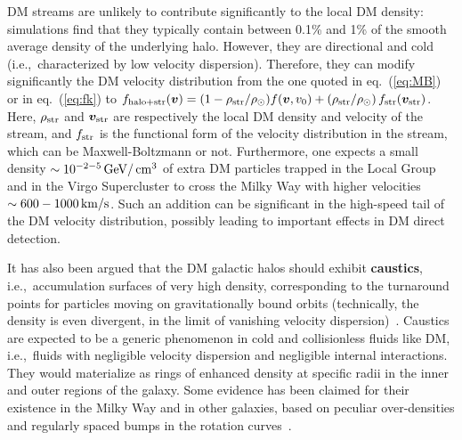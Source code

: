 DM streams are unlikely to contribute significantly to the local DM density: simulations find that they typically contain between 0.1\% and 1\% of the smooth average density of the underlying halo. However, they are directional and cold (i.e.,~characterized by low velocity dispersion). Therefore, they can modify significantly the DM velocity distribution from the one quoted in eq.~(\ref{eq:MB}) or in eq.~(\ref{eq:fk}) to $f_{\rm halo + str}(\vec v) =  (1-\rho_{\rm str} / \rho_\odot) f(\vec v,v_0) + \left( \rho_{\rm str}/\rho_\odot \right) f_{\rm str}(\vec v_{\rm str})$. Here, $\rho_{\rm str}$ and $\vec v_{\rm str}$ are respectively the local DM density and velocity of the stream, and $f_{\rm str}$ is the functional form of the velocity distribution in the stream, which can be Maxwell-Boltzmann or not. 
Furthermore, one expects a small density $\sim 10^{-2-5}\GeV/\cm^3$ of extra DM particles trapped
in the Local Group and in the Virgo Supercluster to cross the Milky Way with higher velocities $\sim 600-1000\,{\rm km/s}$. 
Such an addition can be significant in the high-speed tail of the DM velocity distribution, possibly leading to important effects in DM direct detection. 

\medskip

It has also been argued that the DM galactic halos should exhibit {\bf caustics}, i.e.,~accumulation surfaces of very high density, corresponding to the turnaround points for particles moving on gravitationally bound orbits (technically, the density is even divergent, in the limit of vanishing velocity dispersion)~\cite{caustics}. 
Caustics are expected to be a generic phenomenon in cold and collisionless fluids like DM, i.e.,~fluids with negligible velocity dispersion and negligible internal interactions. 
They would materialize as rings of enhanced density at specific radii in the inner and outer regions of the galaxy. 
Some evidence has been claimed for their existence in the Milky Way and in other galaxies, based on peculiar over-densities and regularly spaced bumps in the rotation curves~\cite{caustics}.



